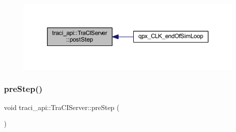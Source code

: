 \nopagebreak
\begin{figure}[H]
\begin{center}
\leavevmode
\includegraphics[width=350pt]{classtraci__api_1_1_tra_c_i_server_af4814a9a99d79f4e00fc102169d10cc2_icgraph}
\end{center}
\end{figure}
\mbox{\label{classtraci__api_1_1_tra_c_i_server_a8cd79e7da542e4abccc75d4933331d20}} 
\subsubsection{\texorpdfstring{pre\+Step()}{preStep()}}
{\footnotesize\ttfamily void traci\+\_\+api\+::\+Tra\+C\+I\+Server\+::pre\+Step (\begin{DoxyParamCaption}{ }\end{DoxyParamCaption})}

